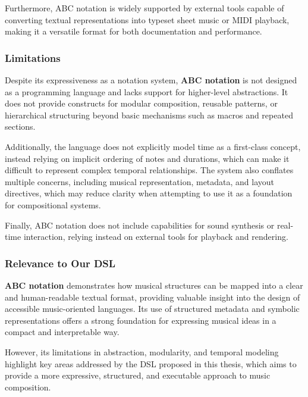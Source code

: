 Furthermore, ABC notation is widely supported by external tools capable of converting textual representations into
typeset sheet music or MIDI playback, making it a versatile format for both documentation and performance.


\subsubsection{Limitations}

Despite its expressiveness as a notation system, \textbf{ABC notation} is not designed as a programming language and
lacks support for higher-level abstractions.
It does not provide constructs for modular composition, reusable patterns, or hierarchical structuring beyond basic
mechanisms such as macros and repeated sections.

Additionally, the language does not explicitly model time as a first-class concept, instead relying on implicit ordering
of notes and durations, which can make it difficult to represent complex temporal relationships.
The system also conflates multiple concerns, including musical representation, metadata, and layout directives, which
may reduce clarity when attempting to use it as a foundation for compositional systems.

Finally, ABC notation does not include capabilities for sound synthesis or real-time interaction, relying instead on
external tools for playback and rendering.


\subsubsection{Relevance to Our DSL}

\textbf{ABC notation} demonstrates how musical structures can be mapped into a clear and human-readable textual format,
providing valuable insight into the design of accessible music-oriented languages.
Its use of structured metadata and symbolic representations offers a strong foundation for expressing musical ideas in a
compact and interpretable way.

However, its limitations in abstraction, modularity, and temporal modeling highlight key areas addressed by the DSL
proposed in this thesis, which aims to provide a more expressive, structured, and executable approach to music
composition.
